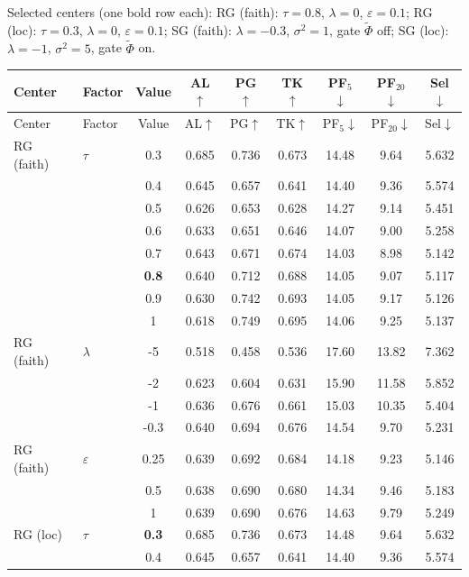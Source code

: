 \noindent Selected centers (one bold row each): RG (faith): $\tau{=}0.8$, $\lambda{=}0$, $\varepsilon{=}0.1$; RG (loc): $\tau{=}0.3$, $\lambda{=}0$, $\varepsilon{=}0.1$; SG (faith): $\lambda{=}{-}0.3$, $\sigma^2{=}1$, gate $\tilde\Phi$ off; SG (loc): $\lambda{=}{-}1$, $\sigma^2{=}5$, gate $\tilde\Phi$ on.\par
\begin{longtable}{@{}l l c c c c c c c@{}}
\toprule
Center & Factor & Value & AL$\uparrow$ & PG$\uparrow$ & TK$\uparrow$ & PF$_5$$\downarrow$ & PF$_{20}$$\downarrow$ & Sel$\downarrow$ \\
\midrule
\endfirsthead
\toprule
Center & Factor & Value & AL$\uparrow$ & PG$\uparrow$ & TK$\uparrow$ & PF$_5$$\downarrow$ & PF$_{20}$$\downarrow$ & Sel$\downarrow$ \\
\midrule
\endhead
\bottomrule
\endlastfoot
RG (faith) & $\tau$ & 0.3 & 0.685 & 0.736 & 0.673 & 14.48 & 9.64 & 5.632 \\
 &  & 0.4 & 0.645 & 0.657 & 0.641 & 14.40 & 9.36 & 5.574 \\
 &  & 0.5 & 0.626 & 0.653 & 0.628 & 14.27 & 9.14 & 5.451 \\
 &  & 0.6 & 0.633 & 0.651 & 0.646 & 14.07 & 9.00 & 5.258 \\
 &  & 0.7 & 0.643 & 0.671 & 0.674 & 14.03 & 8.98 & 5.142 \\
 &  & \textbf{0.8} & 0.640 & 0.712 & 0.688 & 14.05 & 9.07 & 5.117 \\
 &  & 0.9 & 0.630 & 0.742 & 0.693 & 14.05 & 9.17 & 5.126 \\
 &  & 1 & 0.618 & 0.749 & 0.695 & 14.06 & 9.25 & 5.137 \\
\midrule
RG (faith) & $\lambda$ & {-}5 & 0.518 & 0.458 & 0.536 & 17.60 & 13.82 & 7.362 \\
 &  & {-}2 & 0.623 & 0.604 & 0.631 & 15.90 & 11.58 & 5.852 \\
 &  & {-}1 & 0.636 & 0.676 & 0.661 & 15.03 & 10.35 & 5.404 \\
 &  & {-}0.3 & 0.640 & 0.694 & 0.676 & 14.54 & 9.70 & 5.231 \\
\midrule
RG (faith) & $\varepsilon$ & 0.25 & 0.639 & 0.692 & 0.684 & 14.18 & 9.23 & 5.146 \\
 &  & 0.5 & 0.638 & 0.690 & 0.680 & 14.34 & 9.46 & 5.183 \\
 &  & 1 & 0.639 & 0.690 & 0.676 & 14.63 & 9.79 & 5.249 \\
\midrule
RG (loc) & $\tau$ & \textbf{0.3} & 0.685 & 0.736 & 0.673 & 14.48 & 9.64 & 5.632 \\
 &  & 0.4 & 0.645 & 0.657 & 0.641 & 14.40 & 9.36 & 5.574 \\

\end{longtable}

